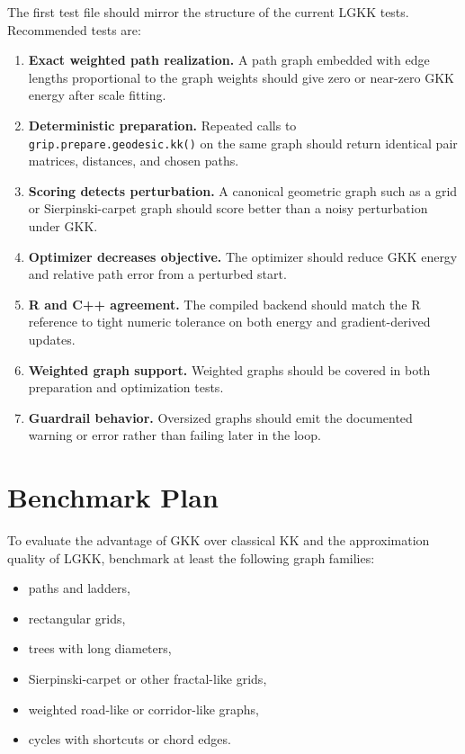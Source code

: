 \documentclass[11pt]{article}
\begin{document}
The first test file should mirror the structure of the current LGKK tests.
Recommended tests are:
\begin{enumerate}[leftmargin=1.5em]
\item \textbf{Exact weighted path realization.} A path graph embedded with edge
lengths proportional to the graph weights should give zero or near-zero GKK
energy after scale fitting.

\item \textbf{Deterministic preparation.} Repeated calls to
\texttt{grip.prepare.geodesic.kk()} on the same graph should return identical
pair matrices, distances, and chosen paths.

\item \textbf{Scoring detects perturbation.} A canonical geometric graph such as
a grid or Sierpinski-carpet graph should score better than a noisy perturbation
under GKK.

\item \textbf{Optimizer decreases objective.} The optimizer should reduce GKK
energy and relative path error from a perturbed start.

\item \textbf{R and C++ agreement.} The compiled backend should match the R
reference to tight numeric tolerance on both energy and gradient-derived updates.

\item \textbf{Weighted graph support.} Weighted graphs should be covered in both
preparation and optimization tests.

\item \textbf{Guardrail behavior.} Oversized graphs should emit the documented
warning or error rather than failing later in the loop.
\end{enumerate}

\section{Benchmark Plan}

To evaluate the advantage of GKK over classical KK and the approximation quality
of LGKK, benchmark at least the following graph families:
\begin{itemize}[leftmargin=1.5em]
\item paths and ladders,
\item rectangular grids,
\item trees with long diameters,
\item Sierpinski-carpet or other fractal-like grids,
\item weighted road-like or corridor-like graphs,
\item cycles with shortcuts or chord edges.
\end{itemize}
\end{document}
